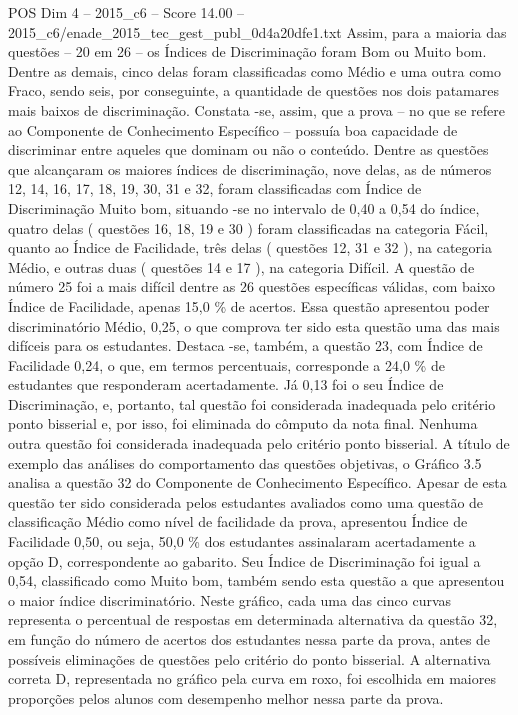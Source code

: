 \begin{textsample}{POS Dim 4 – 2015\_c6 – Score 14.00 – 2015\_c6/enade\_2015\_tec\_gest\_publ\_0d4a20dfe1.txt}
Assim, para a maioria das questões – 20 em 26 – os Índices de Discriminação foram Bom ou Muito bom.
Dentre as demais, cinco delas foram classificadas como Médio e uma outra como Fraco, sendo seis, por conseguinte, a quantidade de questões nos dois patamares mais baixos de discriminação.
Constata -se, assim, que a prova – no que se refere ao Componente de Conhecimento Específico – possuía boa capacidade de discriminar entre aqueles que dominam ou não o conteúdo.
Dentre as questões que alcançaram os maiores índices de discriminação, nove delas, as de números 12, 14, 16, 17, 18, 19, 30, 31 e 32, foram classificadas com Índice de Discriminação Muito bom, situando -se no intervalo de 0,40 a 0,54 do índice, quatro delas ( questões 16, 18, 19 e 30 ) foram classificadas na categoria Fácil, quanto ao Índice de Facilidade, três delas ( questões 12, 31 e 32 ), na categoria Médio, e outras duas ( questões 14 e 17 ), na categoria Difícil.
A questão de número 25 foi a mais difícil dentre as 26 questões específicas válidas, com baixo Índice de Facilidade, apenas 15,0 \% de acertos.
Essa questão apresentou poder discriminatório Médio, 0,25, o que comprova ter sido esta questão uma das mais difíceis para os estudantes.
Destaca -se, também, a questão 23, com Índice de Facilidade 0,24, o que, em termos percentuais, corresponde a 24,0 \% de estudantes que responderam acertadamente.
Já 0,13 foi o seu Índice de Discriminação, e, portanto, tal questão foi considerada inadequada pelo critério ponto bisserial e, por isso, foi eliminada do cômputo da nota final.
Nenhuma outra questão foi considerada inadequada pelo critério ponto bisserial.
A título de exemplo das análises do comportamento das questões objetivas, o Gráfico 3.5 analisa a questão 32 do Componente de Conhecimento Específico.
Apesar de esta questão ter sido considerada pelos estudantes avaliados como uma questão de classificação Médio como nível de facilidade da prova, apresentou Índice de Facilidade 0,50, ou seja, 50,0 \% dos estudantes assinalaram acertadamente a opção D, correspondente ao gabarito.
Seu Índice de Discriminação foi igual a 0,54, classificado como Muito bom, também sendo esta questão a que apresentou o maior índice discriminatório.
Neste gráfico, cada uma das cinco curvas representa o percentual de respostas em determinada alternativa da questão 32, em função do número de acertos dos estudantes nessa parte da prova, antes de possíveis eliminações de questões pelo critério do ponto bisserial.
A alternativa correta D, representada no gráfico pela curva em roxo, foi escolhida em maiores proporções pelos alunos com desempenho melhor nessa parte da prova.

\end{textsample}
